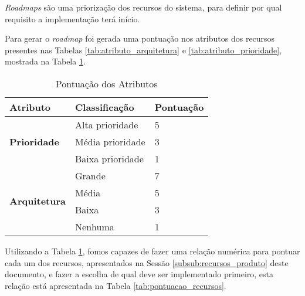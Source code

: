 
\textit{Roadmaps} são uma priorização dos recursos do sistema, para definir por qual requisito a implementação terá início.

Para gerar o \textit{roadmap} foi gerada uma pontuação nos atributos dos recursos presentes nas Tabelas \ref{tab:atributo_arquitetura} e \ref{tab:atributo_prioridade}, mostrada na Tabela \ref{tab:pontuacao_atributos}.

\begin{table}[H]
\centering
\begin{tabular}{|p{2cm}|p{5cm}|p{3cm}|}

\hline
\textbf{Atributo} &
\textbf{Classificação} &
\textbf{Pontuação}
\\ \hline

\multirow{3}{*}{
\textbf{Prioridade}} &
	Alta prioridade &
	5
	\\ \cline{2-3} &
	Média prioridade  &
	3
	\\ \cline{2-3} &
	Baixa prioridade  &
	1
	\\ \hline

\multirow{4}{*}{\textbf{Arquitetura}} &
	Grande &
	7
	\\ \cline{2-3} &
	Média &
	5
	\\ \cline{2-3} &
	Baixa &
	3
	\\ \cline{2-3} &
	Nenhuma &
	1
	\\ \hline
\end{tabular}
\caption{Pontuação dos Atributos}
\label{tab:pontuacao_atributos}
\end{table}

Utilizando a Tabela \ref{tab:pontuacao_atributos}, fomos capazes de fazer uma relação numérica para pontuar cada um dos recursos, apresentados na Sessão \ref{subsub:recursos_produto} deste documento, e fazer a escolha de qual deve ser implementado primeiro, esta relação está apresentada na Tabela \ref{tab:pontuacao_recursos}.

